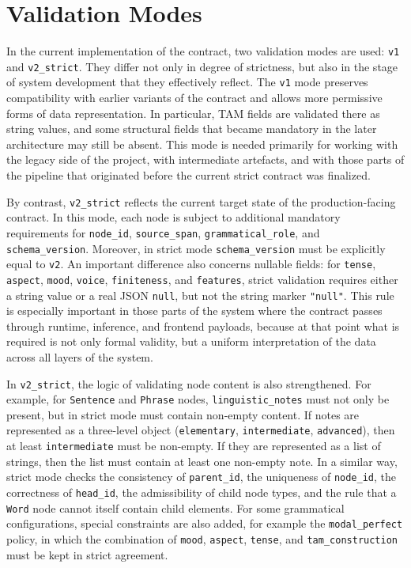 \documentclass[12pt,a4paper,oneside]{report}
\begin{document}
\section{Validation Modes}
In the current implementation of the contract, two validation modes are used: \texttt{v1} and \texttt{v2\_strict}. They differ not only in degree of strictness, but also in the stage of system development that they effectively reflect. The \texttt{v1} mode preserves compatibility with earlier variants of the contract and allows more permissive forms of data representation. In particular, TAM fields are validated there as string values, and some structural fields that became mandatory in the later architecture may still be absent. This mode is needed primarily for working with the legacy side of the project, with intermediate artefacts, and with those parts of the pipeline that originated before the current strict contract was finalized.

By contrast, \texttt{v2\_strict} reflects the current target state of the production-facing contract. In this mode, each node is subject to additional mandatory requirements for \texttt{node\_id}, \texttt{source\_span}, \texttt{grammatical\_role}, and \texttt{schema\_version}. Moreover, in strict mode \texttt{schema\_version} must be explicitly equal to \texttt{v2}. An important difference also concerns nullable fields: for \texttt{tense}, \texttt{aspect}, \texttt{mood}, \texttt{voice}, \texttt{finiteness}, and \texttt{features}, strict validation requires either a string value or a real JSON \texttt{null}, but not the string marker \texttt{"null"}. This rule is especially important in those parts of the system where the contract passes through runtime, inference, and frontend payloads, because at that point what is required is not only formal validity, but a uniform interpretation of the data across all layers of the system.

In \texttt{v2\_strict}, the logic of validating node content is also strengthened. For example, for \texttt{Sentence} and \texttt{Phrase} nodes, \texttt{linguistic\_notes} must not only be present, but in strict mode must contain non-empty content. If notes are represented as a three-level object (\texttt{elementary}, \texttt{intermediate}, \texttt{advanced}), then at least \texttt{intermediate} must be non-empty. If they are represented as a list of strings, then the list must contain at least one non-empty note. In a similar way, strict mode checks the consistency of \texttt{parent\_id}, the uniqueness of \texttt{node\_id}, the correctness of \texttt{head\_id}, the admissibility of child node types, and the rule that a \texttt{Word} node cannot itself contain child elements. For some grammatical configurations, special constraints are also added, for example the \texttt{modal\_perfect} policy, in which the combination of \texttt{mood}, \texttt{aspect}, \texttt{tense}, and \texttt{tam\_construction} must be kept in strict agreement.
\end{document}
